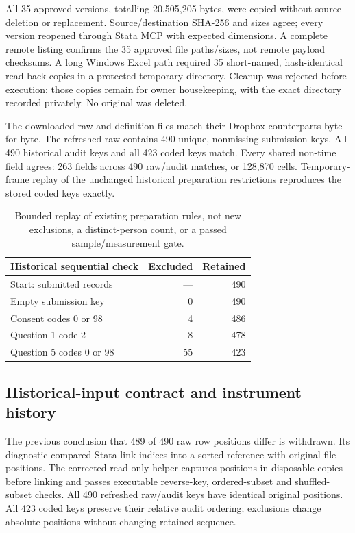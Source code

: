 \documentclass[11pt,a4paper]{article}
\begin{document}
All 35 approved versions, totalling 20,505,205 bytes, were copied without source deletion or replacement. Source/destination SHA-256 and sizes agree; every version reopened through Stata MCP with expected dimensions. A complete remote listing confirms the 35 approved file paths/sizes, not remote payload checksums. A long Windows Excel path required 35 short-named, hash-identical read-back copies in a protected temporary directory. Cleanup was rejected before execution; those copies remain for owner housekeeping, with the exact directory recorded privately. No original was deleted.

The downloaded raw and definition files match their Dropbox counterparts byte for byte. The refreshed raw contains 490 unique, nonmissing submission keys. All 490 historical audit keys and all 423 coded keys match. Every shared non-time field agrees: 263 fields across 490 raw/audit matches, or 128,870 cells. Temporary-frame replay of the unchanged historical preparation restrictions reproduces the stored coded keys exactly.

\begin{table}[htbp]
\centering
\small
\begin{tabularx}{\textwidth}{@{}Xrr@{}}
\toprule
Historical sequential check & Excluded & Retained \\
\midrule
Start: submitted records & --- & 490 \\
Empty submission key & 0 & 490 \\
Consent codes 0 or 98 & 4 & 486 \\
Question 1 code 2 & 8 & 478 \\
Question 5 codes 0 or 98 & 55 & 423 \\
\bottomrule
\end{tabularx}
\caption{Bounded replay of existing preparation rules, not new exclusions, a distinct-person count, or a passed sample/measurement gate.}
\end{table}

\subsection{Historical-input contract and instrument history}

The previous conclusion that 489 of 490 raw row positions differ is withdrawn. Its diagnostic compared Stata link indices into a sorted reference with original file positions. The corrected read-only helper captures positions in disposable copies before linking and passes executable reverse-key, ordered-subset and shuffled-subset checks. All 490 refreshed raw/audit keys have identical original positions. All 423 coded keys preserve their relative audit ordering; exclusions change absolute positions without changing retained sequence.
\end{document}
